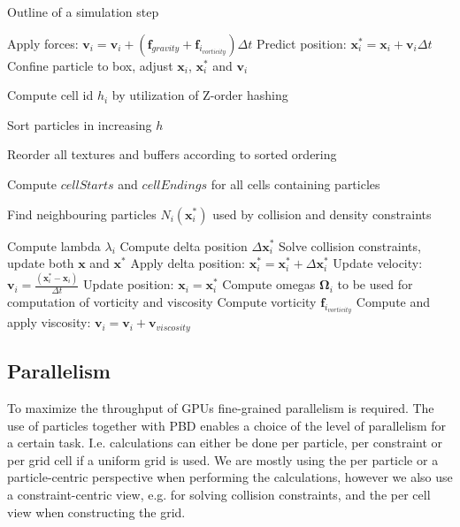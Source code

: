 \begin{algorithm}
\caption{Outline of a simulation step}
\label{alg:overview}
\begin{algorithmic}[1]
\small

\State Apply forces: $\mathbf{v}_{i} = \mathbf{v}_{i} + (\mathbf{f}_{gravity} + \mathbf{f}_{i_{vorticity}})\Delta t$
\State Predict position: $\mathbf{x}_{i}^{*}= \mathbf{x}_{i} + \mathbf{v}_{i} \Delta t$
\State Confine particle to box, adjust $\mathbf{x}_{i}$, $\mathbf{x}_{i}^{*}$ and $\mathbf{v}_{i}$ 
\EndFor


\State Compute cell id $h_{i}$ by utilization of Z-order hashing
\EndFor

\State Sort particles in increasing $h$

\State Reorder all textures and buffers according to sorted ordering

\State Compute $cellStarts$ and $cellEndings$ for all cells containing particles


\State Find neighbouring particles $N_{i}(\mathbf{x}_{i}^{*})$ used by collision and density constraints
\EndFor

\State Compute lambda $\lambda_{i}$
\EndFor
{}
\State Compute delta position $\Delta \mathbf{x}_{i}^{*}$
\EndFor
{}
\State Solve collision constraints, update both $\mathbf{x}$ and $\mathbf{x}^{*}$
\EndWhile
{}
\State Apply delta position: $\mathbf{x}_{i}^{*} = \mathbf{x}_{i}^{*} + \Delta \mathbf{x}_{i}^{*}$
\EndFor
\EndWhile
{}
\State Update velocity: $\mathbf{v}_{i} = \frac{(\mathbf{x}_{i}^{*} - \mathbf{x}_{i})}{\Delta t}$
\State Update position: $\mathbf{x}_{i} = \mathbf{x}_{i}^{*}$
\EndFor
{}
\State Compute omegas $\mathbf{\Omega}_{i}$ to be used for computation of vorticity and viscosity
\EndFor
{}
\State Compute vorticity $\mathbf{f}_{i_{vorticity}}$
\EndFor
{}
\State Compute and apply viscosity: $\mathbf{v}_{i} = \mathbf{v}_{i} + \mathbf{v}_{viscosity}$
\EndFor

\end{algorithmic}
\end{algorithm}


\subsection{Parallelism}
To maximize the throughput of GPUs fine-grained parallelism is required. The use of particles together with PBD enables a choice of the level of parallelism for a certain task. I.e. calculations can either be done per particle, per constraint or per grid cell if a uniform grid is used. We are mostly using the per particle or a particle-centric perspective when performing the calculations, however we also use a constraint-centric view, e.g. for solving collision constraints, and the per cell view when constructing the grid.

